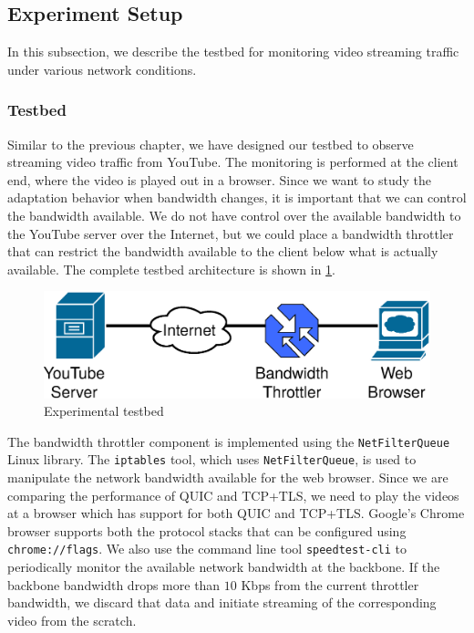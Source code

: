 \subsection{Experiment Setup}
\label{sec:experiments}

In this subsection, we describe the testbed for monitoring video streaming traffic under various network conditions.

\subsubsection{Testbed}
Similar to the previous chapter, we have designed our testbed to observe streaming video traffic from YouTube. 
The monitoring is performed at the client end, where the video is played out in a browser.
Since we want to study the adaptation behavior when bandwidth changes, it is important that we can control the bandwidth available.
We do not have control over the available bandwidth to the YouTube server over the Internet, but we could place a bandwidth throttler that can restrict the bandwidth available to the client below what is actually available.
The complete testbed architecture is shown in \fig\ref{fig:experimentalSetup}.

\begin{figure}[!t]
	\centering
	\includegraphics[width=0.7\linewidth]{img/experimentalSetup}
	\caption{Experimental testbed}
	\label{fig:experimentalSetup}
\end{figure}

The bandwidth throttler component is implemented using the {\tt NetFilterQueue} Linux library.
The {\tt iptables} tool, which uses {\tt NetFilterQueue}, is used to manipulate the network bandwidth available for the web browser.
Since we are comparing the performance of QUIC and TCP+TLS, we need to play the videos at a browser which has support for both QUIC and TCP+TLS. Google's Chrome browser supports both the protocol stacks that can be configured using {\tt chrome://flags}. We also use the command line tool \texttt{speedtest-cli} to periodically monitor the available network bandwidth at the backbone. If the backbone bandwidth drops more than $10$ Kbps from the current throttler bandwidth, we discard that data and initiate streaming of the corresponding video from the scratch.

